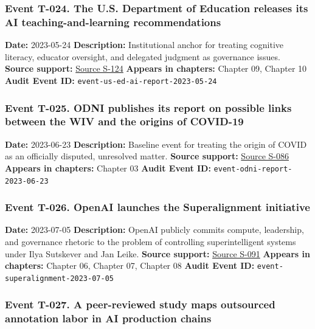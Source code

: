 \documentclass[
  american,
  11pt,
  letterpaper,
]{article}
\begin{document}
\subsubsection{Event T-024. The U.S. Department of Education releases
its AI teaching-and-learning
recommendations}\label{event-t-024-the-u-s-department-of-education-releases-its-ai-teaching-and-learning-recommendations}

\textbf{Date:} 2023-05-24 \textbf{Description:} Institutional anchor for
treating cognitive literacy, educator oversight, and delegated judgment
as governance issues. \textbf{Source support:}
\hyperref[source-s-124-artificial-intelligence-and-the-future-of-teaching-and-learning-insights-and-recommendations]{Source
S-124} \textbf{Appears in chapters:} Chapter 09, Chapter 10
\textbf{Audit Event ID:} \texttt{event-us-ed-ai-report-2023-05-24}

\subsubsection{Event T-025. ODNI publishes its report on possible links
between the WIV and the origins of
COVID-19}\label{event-t-025-odni-publishes-its-report-on-possible-links-between-the-wiv-and-the-origins-of-covid-19}

\textbf{Date:} 2023-06-23 \textbf{Description:} Baseline event for
treating the origin of COVID as an officially disputed, unresolved
matter. \textbf{Source support:}
\hyperref[source-s-086-report-on-potential-links-between-the-wuhan-institute-of-virology-and-the-origins-of-covid-19]{Source
S-086} \textbf{Appears in chapters:} Chapter 03 \textbf{Audit Event ID:}
\texttt{event-odni-report-2023-06-23}

\subsubsection{Event T-026. OpenAI launches the Superalignment
initiative}\label{event-t-026-openai-launches-the-superalignment-initiative}

\textbf{Date:} 2023-07-05 \textbf{Description:} OpenAI publicly commits
compute, leadership, and governance rhetoric to the problem of
controlling superintelligent systems under Ilya Sutskever and Jan Leike.
\textbf{Source support:}
\hyperref[source-s-091-introducing-superalignment]{Source S-091}
\textbf{Appears in chapters:} Chapter 06, Chapter 07, Chapter 08
\textbf{Audit Event ID:} \texttt{event-superalignment-2023-07-05}

\subsubsection{Event T-027. A peer-reviewed study maps outsourced
annotation labor in AI production
chains}\label{event-t-027-a-peer-reviewed-study-maps-outsourced-annotation-labor-in-ai-production-chains}
\end{document}
